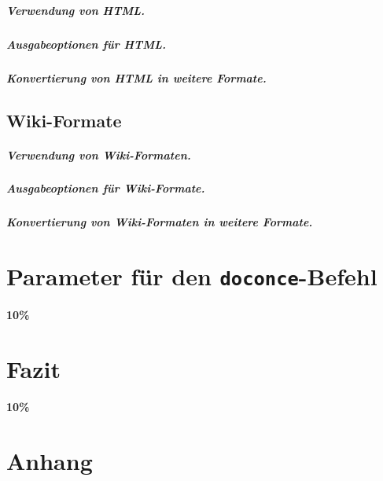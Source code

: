 \documentclass[%
oneside,                 %
final,                   %
chapterprefix=true,      %
open=right,              %
10pt]{book}
\begin{document}
\paragraph{ Verwendung von HTML.}
\paragraph{ Ausgabeoptionen für HTML.}
\paragraph{ Konvertierung von HTML in weitere Formate.}
\section{Wiki-Formate}
\paragraph{ Verwendung von Wiki-Formaten.}
\paragraph{ Ausgabeoptionen für Wiki-Formate.}
\paragraph{ Konvertierung von Wiki-Formaten in weitere Formate.}
\chapter{Parameter für den \texttt{doconce}-Befehl}
\textbf{10\%}
\chapter{Fazit}
\textbf{10\%}
\chapter{Anhang}
\end{document}
